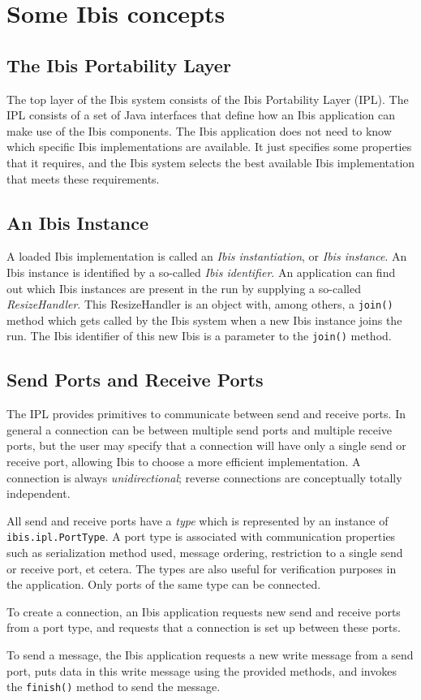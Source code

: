 \documentclass[10pt]{article}
\newcommand{\mysection}[1]{\section{#1}\label{#1}}
\newcommand{\mysubsection}[1]{\subsection{#1}\label{#1}}
\begin{document}
\mysection{Some Ibis concepts}

\mysubsection{The Ibis Portability Layer}

The top layer of the Ibis system consists of the Ibis Portability Layer (IPL).
The IPL consists of a set of Java interfaces that define how an Ibis application
can make use of the Ibis components.
The Ibis application does not need to know which specific Ibis implementations are
available.
It just specifies some properties that it requires, and the Ibis system
selects the best available Ibis implementation that meets these requirements.
 
\mysubsection{An Ibis Instance}

A loaded Ibis implementation is called an \emph{Ibis instantiation}, or 
\emph{Ibis instance}.
An Ibis instance is identified by a so-called
\emph{Ibis identifier}.
An application can find out which Ibis instances are present in the run
by supplying a so-called \emph{ResizeHandler}.
This ResizeHandler is an object with, among others, a \texttt{join()}
method which gets called by the Ibis system when a new Ibis instance
joins the run.  The Ibis identifier of this new Ibis is a parameter
to the \texttt{join()} method.

\mysubsection{Send Ports and Receive Ports}

The IPL provides primitives to communicate between send and receive ports.
In general a connection can be between multiple send ports and multiple
receive ports, but the user may specify that a connection will have only
a single send or receive port, allowing Ibis to choose a more efficient
implementation.  A connection is always \emph{unidirectional}; reverse
connections are conceptually totally independent.

All send and receive ports have a \emph{type} which is represented by an
instance of \texttt{ibis.ipl.PortType}. A port type is associated
with communication properties such as serialization method used, message
ordering, restriction to a single send or receive port, et cetera. The
types are also useful for verification purposes in the application.
Only ports of the same type can be connected.

To create a connection, an Ibis application requests new send and receive
ports from a port type, and requests that a connection is set up 
between these ports.

To send a message, the Ibis application requests a new write message from
a send port, puts data in this write message using the provided methods,
and invokes the \texttt{finish()} method to send the message.
\end{document}
